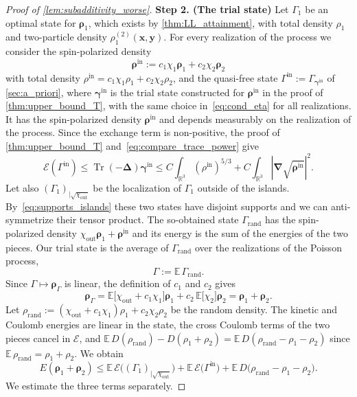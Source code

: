 \documentclass[final,reqno]{amsart}
\theoremstyle{remark}
\renewcommand{\le}{\leqslant}
\DeclareMathOperator{\Tr}{Tr}
\newcommand{\RR}{\mathbb{R}}
\newcommand{\EE}{\mathbb{E}}
\newcommand{\lapl}{\bm{\Delta}}
\newcommand{\grad}{\bm{\nabla}}
\newcommand{\EC}{\mathcal{E}}
\begin{document}
\begin{proof}[Proof of \cref{lem:subadditivity_worse}]
\noindent\textbf{Step 2. (The trial state)} Let $\Gamma_1$ be an optimal state for $\bm{\rho}_1$, which exists by \cref{thm:LL_attainment}, with total density $\rho_1$ and two-particle density $\rho_1^{(2)}(\mathbf{x},\mathbf{y})$. For every realization of the process we consider the spin-polarized density
$$
\bm{\rho}^{\mathrm{in}}:=c_1\chi_1\bm{\rho}_1+c_2\chi_2\bm{\rho}_2
$$
with total density $\rho^{\mathrm{in}}=c_1\chi_1\rho_1+c_2\chi_2\rho_2$, and the quasi-free state $\Gamma^{\mathrm{in}}:=\Gamma_{\bm{\gamma}^{\mathrm{in}}}$ of \cref{sec:a_priori}, where $\bm{\gamma}^{\mathrm{in}}$ is the trial state constructed for $\bm{\rho}^{\mathrm{in}}$ in the proof of \cref{thm:upper_bound_T}, with the same choice in~\cref{eq:cond_eta} for all realizations. It has the spin-polarized density $\bm{\rho}^{\mathrm{in}}$ and depends measurably on the realization of the process. Since the exchange term is non-positive, the proof of \cref{thm:upper_bound_T} and~\cref{eq:compare_trace_power} give
$$
\EC(\Gamma^{\mathrm{in}})\le\Tr(-\lapl)\bm{\gamma}^{\mathrm{in}}\le C\int_{\RR^3}(\rho^{\mathrm{in}})^{5/3}+C\int_{\RR^3}|\grad\sqrt{\bm{\rho}^{\mathrm{in}}}|^2.
$$
Let also $(\Gamma_1)_{|\sqrt{\chi_{\mathrm{out}}}}$ be the localization of $\Gamma_1$ outside of the islands. By~\cref{eq:supports_islands} these two states have disjoint supports and we can anti-symmetrize their tensor product. The so-obtained state $\Gamma_{\mathrm{rand}}$ has the spin-polarized density $\chi_{\mathrm{out}}\bm{\rho}_1+\bm{\rho}^{\mathrm{in}}$ and its energy is the sum of the energies of the two pieces. Our trial state is the average of $\Gamma_{\mathrm{rand}}$ over the realizations of the Poisson process,
$$
\Gamma:=\EE\,\Gamma_{\mathrm{rand}}.
$$
Since $\Gamma\mapsto\bm{\rho}_\Gamma$ is linear, the definition of $c_1$ and $c_2$ gives
$$
\bm{\rho}_\Gamma=\EE\big[\chi_{\mathrm{out}}+c_1\chi_1\big]\bm{\rho}_1+c_2\,\EE\big[\chi_2\big]\bm{\rho}_2=\bm{\rho}_1+\bm{\rho}_2.
$$
Let $\rho_{\mathrm{rand}}:=(\chi_{\mathrm{out}}+c_1\chi_1)\rho_1+c_2\chi_2\rho_2$ be the random density. The kinetic and Coulomb energies are linear in the state, the cross Coulomb terms of the two pieces cancel in $\EC$, and $\EE\,D(\rho_{\mathrm{rand}})-D(\rho_1+\rho_2)=\EE\,D(\rho_{\mathrm{rand}}-\rho_1-\rho_2)$ since $\EE\,\rho_{\mathrm{rand}}=\rho_1+\rho_2$. We obtain
\begin{equation}\label{eq:three_terms}
E(\bm{\rho}_1+\bm{\rho}_2)\le\EE\,\EC\big((\Gamma_1)_{|\sqrt{\chi_{\mathrm{out}}}}\big)+\EE\,\EC\big(\Gamma^{\mathrm{in}}\big)+\EE\,D\big(\rho_{\mathrm{rand}}-\rho_1-\rho_2\big).
\end{equation}
We estimate the three terms separately.


\end{proof}
\end{document}

